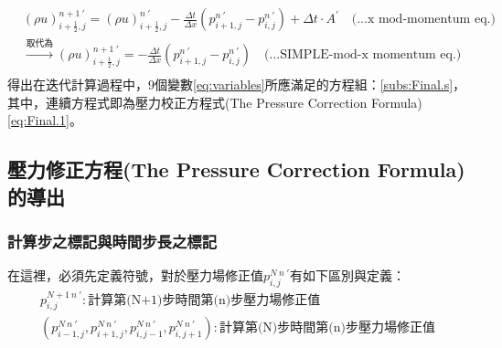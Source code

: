 \documentclass[12pt]{article}
\begin{document}
\begin{equation}\begin{split}
    &(\rho u)_{i+\frac{1}{2},j}^{n+1\ \prime} = (\rho u)_{i+\frac{1}{2},j}^{n\ \prime} - \frac{\Delta t}{\Delta x}(p_{i+1,j}^{n\ \prime} - p_{i,j}^{n\ \prime}) + \Delta t \cdot A^{\prime}  \quad \text{(...x mod-momentum eq.)}\\[1.5ex]
    &\xrightarrow{\text{取代為}} (\rho u)_{i+\frac{1}{2},j}^{n+1\ \prime} = - \frac{\Delta t}{\Delta x}(p_{i+1,j}^{n\ \prime} - p_{i,j}^{n\ \prime})  \quad \text{(...SIMPLE-mod-x momentum eq.)}\\[1.5ex]
\end{split}\end{equation}
\noindent 得出在迭代計算過程中，9個變數\eqref{eq:variables}所應滿足的方程組：\ref{subs:Final.s}，其中，連續方程式即為壓力校正方程式(The Pressure Correction Formula)\eqref{eq:Final.1}。
\subsection{壓力修正方程(The Pressure Correction Formula)的導出}
\subsubsection{計算步之標記與時間步長之標記}

在這裡，必須先定義符號，對於壓力場修正值$p_{i,j}^{N\ n\ \prime}$有如下區別與定義：\\
\[
\begin{array}{l}
    p_{i,j}^{N+1\ n\ \prime} : \text{計算第(N+1)步時間第(n)步壓力場修正值}\\[1.5ex]
    (p_{i-1,j}^{N\ n\ \prime},p_{i+1,j}^{N\ n\ \prime},p_{i,j-1}^{N\ n\ \prime},p_{i,j+1}^{N\ n\ \prime}):\text{計算第(N)步時間第(n)步壓力場修正值}\\[1.5ex]
\end{array}
\]
\end{document}

